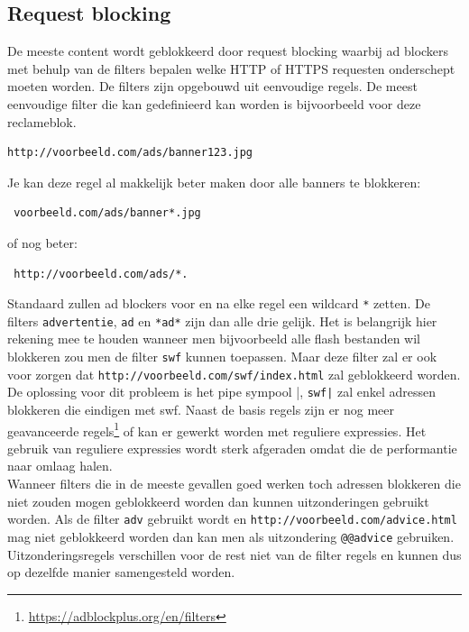 \documentclass[pdftex,a4paper,12pt,twoside]{report}
\begin{document}
\subsection{Request blocking}
\label{sec:Request blocking}
De meeste content wordt geblokkeerd door request blocking waarbij ad blockers met behulp van de filters bepalen welke HTTP of HTTPS requesten onderschept moeten worden. De filters zijn opgebouwd uit eenvoudige regels. De meest eenvoudige filter die kan gedefinieerd kan worden is bijvoorbeeld voor deze reclameblok.
\lstset{language=Html,tabsize=2}  
\begin{lstlisting}
http://voorbeeld.com/ads/banner123.jpg
\end{lstlisting}
Je kan deze regel al makkelijk beter maken door alle banners te blokkeren:
\lstset{language=Html,tabsize=2}  
\begin{lstlisting}
 voorbeeld.com/ads/banner*.jpg 
\end{lstlisting}
 of nog beter:
\lstset{language=Html,tabsize=2}  
\begin{lstlisting}
 http://voorbeeld.com/ads/*.
\end{lstlisting}
Standaard zullen ad blockers voor en na elke regel een wildcard \texttt{*} zetten. De filters \texttt{advertentie}, \texttt{ad} en \texttt{*ad*} zijn dan alle drie gelijk. Het is belangrijk hier rekening mee te houden wanneer men bijvoorbeeld alle flash bestanden wil blokkeren zou men de filter \texttt{swf} kunnen toepassen. Maar deze filter zal er ook voor zorgen dat \texttt{http://voorbeeld.com/swf/index.html} zal geblokkeerd worden. De oplossing voor dit probleem is het pipe sympool |, \texttt{swf|} zal enkel adressen blokkeren die eindigen met swf. 
Naast de basis regels zijn er nog meer geavanceerde regels\footnote{\url{https://adblockplus.org/en/filters}} of kan er gewerkt worden met reguliere expressies. Het gebruik van reguliere expressies wordt sterk afgeraden omdat die de performantie naar omlaag halen.
\\
Wanneer filters die in de meeste gevallen goed werken toch adressen blokkeren die niet zouden mogen geblokkeerd worden dan kunnen uitzonderingen gebruikt worden. Als de filter \texttt{adv} gebruikt wordt en \texttt{http://voorbeeld.com/advice.html} mag niet geblokkeerd worden dan kan men als uitzondering \texttt{@@advice} gebruiken. Uitzonderingsregels verschillen voor de rest niet van de filter regels en kunnen dus op dezelfde manier samengesteld worden.
\end{document}

